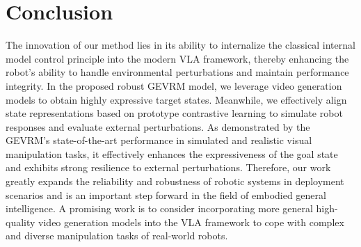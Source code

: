 \vspace{-1.em}
\section{Conclusion}
\vspace{-0.5em}
The innovation of our method lies in its ability to internalize the classical internal model control principle into the modern VLA framework, thereby enhancing the robot's ability to handle environmental perturbations and maintain performance integrity. 
In the proposed robust GEVRM model, we leverage video generation models to obtain highly expressive target states.
Meanwhile, we effectively align state representations based on prototype contrastive learning to simulate robot responses and evaluate external perturbations.
As demonstrated by the GEVRM's state-of-the-art performance in simulated and realistic visual manipulation tasks, it effectively enhances the expressiveness of the goal state and exhibits strong resilience to external perturbations. 
Therefore, our work greatly expands the reliability and robustness of robotic systems in deployment scenarios and is an important step forward in the field of embodied general intelligence.
A promising work is to consider incorporating more general high-quality video generation models into the VLA framework to cope with complex and diverse manipulation tasks of real-world robots.

\clearpage